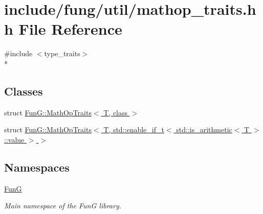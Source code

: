 \hypertarget{mathop__traits_8hh}{\section{include/fung/util/mathop\-\_\-traits.hh File Reference}
\label{mathop__traits_8hh}
}
{\ttfamily \#include $<$type\-\_\-traits$>$}\\*
\subsection*{Classes}
\begin{DoxyCompactItemize}
\item 
struct \hyperlink{structFunG_1_1MathOpTraits}{Fun\-G\-::\-Math\-Op\-Traits$<$ T, class $>$}
\item 
struct \hyperlink{structFunG_1_1MathOpTraits_3_01T_00_01std_1_1enable__if__t_3_01std_1_1is__arithmetic_3_01T_01_4_1_1value_01_4_01_4}{Fun\-G\-::\-Math\-Op\-Traits$<$ T, std\-::enable\-\_\-if\-\_\-t$<$ std\-::is\-\_\-arithmetic$<$ T $>$\-::value $>$ $>$}
\end{DoxyCompactItemize}
\subsection*{Namespaces}
\begin{DoxyCompactItemize}
\item 
\hyperlink{namespaceFunG}{Fun\-G}
\begin{DoxyCompactList}\small\item\em Main namespace of the Fun\-G library. \end{DoxyCompactList}\end{DoxyCompactItemize}
